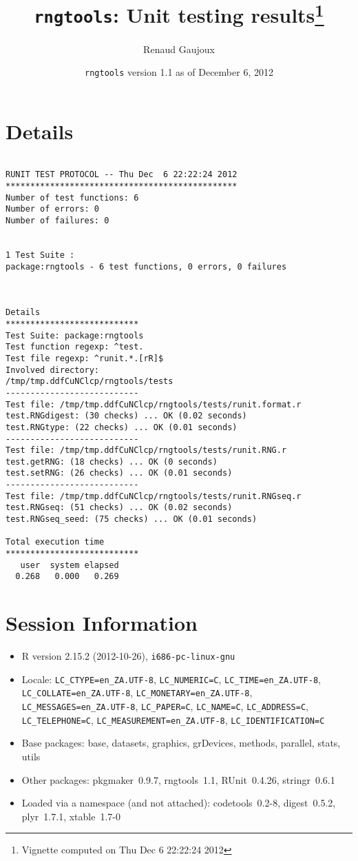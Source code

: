 \documentclass[10pt]{article}
\author{Renaud Gaujoux}
\title{\texttt{rngtools}: Unit testing results\footnote{Vignette computed  on Thu Dec  6 22:22:24 2012}}
\date{\texttt{rngtools} version 1.1 as of December  6, 2012}
\begin{document}
\maketitle

\section{Details}
\begin{verbatim}

RUNIT TEST PROTOCOL -- Thu Dec  6 22:22:24 2012 
*********************************************** 
Number of test functions: 6 
Number of errors: 0 
Number of failures: 0 

 
1 Test Suite : 
package:rngtools - 6 test functions, 0 errors, 0 failures



Details 
*************************** 
Test Suite: package:rngtools 
Test function regexp: ^test. 
Test file regexp: ^runit.*.[rR]$ 
Involved directory: 
/tmp/tmp.ddfCuNClcp/rngtools/tests 
--------------------------- 
Test file: /tmp/tmp.ddfCuNClcp/rngtools/tests/runit.format.r 
test.RNGdigest: (30 checks) ... OK (0.02 seconds)
test.RNGtype: (22 checks) ... OK (0.01 seconds)
--------------------------- 
Test file: /tmp/tmp.ddfCuNClcp/rngtools/tests/runit.RNG.r 
test.getRNG: (18 checks) ... OK (0 seconds)
test.setRNG: (26 checks) ... OK (0.01 seconds)
--------------------------- 
Test file: /tmp/tmp.ddfCuNClcp/rngtools/tests/runit.RNGseq.r 
test.RNGseq: (51 checks) ... OK (0.02 seconds)
test.RNGseq_seed: (75 checks) ... OK (0.01 seconds)

Total execution time
***************************
   user  system elapsed 
  0.268   0.000   0.269 

\end{verbatim}

\section*{Session Information}
\begin{itemize}\raggedright
  \item R version 2.15.2 (2012-10-26), \verb|i686-pc-linux-gnu|
  \item Locale: \verb|LC_CTYPE=en_ZA.UTF-8|, \verb|LC_NUMERIC=C|, \verb|LC_TIME=en_ZA.UTF-8|, \verb|LC_COLLATE=en_ZA.UTF-8|, \verb|LC_MONETARY=en_ZA.UTF-8|, \verb|LC_MESSAGES=en_ZA.UTF-8|, \verb|LC_PAPER=C|, \verb|LC_NAME=C|, \verb|LC_ADDRESS=C|, \verb|LC_TELEPHONE=C|, \verb|LC_MEASUREMENT=en_ZA.UTF-8|, \verb|LC_IDENTIFICATION=C|
  \item Base packages: base, datasets, graphics, grDevices, methods,
    parallel, stats, utils
  \item Other packages: pkgmaker~0.9.7, rngtools~1.1, RUnit~0.4.26,
    stringr~0.6.1
  \item Loaded via a namespace (and not attached): codetools~0.2-8,
    digest~0.5.2, plyr~1.7.1, xtable~1.7-0
\end{itemize}
\end{document}

